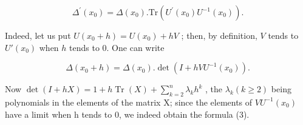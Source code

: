 \[
\varDelta^ {\prime} (x _ {0}) = \varDelta (x _ {0}). \mathrm{Tr} (U ^ {\prime} (x _ {0}) U ^ {- 1} (x _ {0})).\tag{3}
\]

Indeed, let us put \(U(x_0 + h) = U(x_0) + hV\) ; then, by definition, \(V\) tends to \(U'(x_0)\) when \(h\) tends to 0. One can write

\[
\Delta (x _ {0} + h) = \Delta (x _ {0}). \det (I + h V U ^ {- 1} (x _ {0})).
\]

Now \(\det(I + hX) = 1 + h\operatorname{Tr}(X) + \sum_{k=2}^{n} \lambda_k h^k\) , the \(\lambda_k (k \geqslant 2)\) being polynomials in the elements of the matrix X; since the elements of \(VU^{-1}(x_0)\) have a limit when h tends to 0, we indeed obtain the formula (3).

